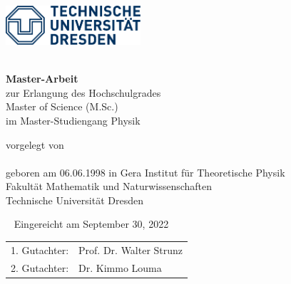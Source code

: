 \makeatletter
\thispagestyle{empty}
\begin{titlepage}
  \includegraphics[width=5cm]{figs/logo.pdf}
  \vspace{1em}

  {\centering
  \vspace*{5em}
  {\bfseries\Huge \@title\\}
  \vspace*{2em}
  {\Large\@subtitle}
    \vfill \vfill
    {\large {\bfseries Master-Arbeit} \\
      zur Erlangung des Hochschulgrades\\
      Master of Science (M.Sc.)\\
      im Master-Studiengang Physik}

    \vfill
      {vorgelegt von\\
      {\large \@author}\\
      geboren am 06.06.1998 in Gera}
  \vfill
  {\large Institut f\"ur Theoretische Physik\\
    Fakultät Mathematik und Naturwissenschaften\\
    Technische Universität Dresden \\}
}

\newpage \thispagestyle{empty}\ \newpage
\clearpage
\thispagestyle{empty}
\null\vfill
{\large Eingereicht am September 30, 2022}

\begin{tabular*}{.5\linewidth}[h]{ll}
  1. Gutachter: & Prof. Dr. Walter Strunz \\
  2. Gutachter: & Dr. Kimmo Louma \\
\end{tabular*}
\end{titlepage}
\makeatother
